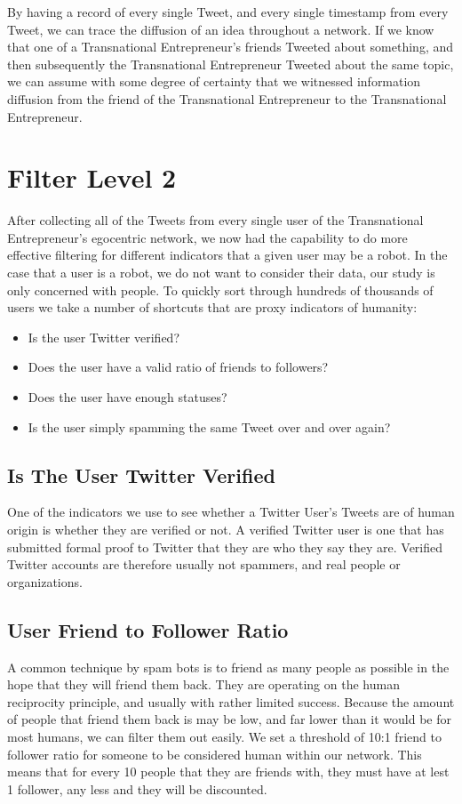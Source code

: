 By having a record of every single Tweet, and every single
timestamp from every Tweet, we can trace the diffusion of an idea
throughout a network. If we know that one of a Transnational
Entrepreneur's friends Tweeted about something, and then subsequently
the Transnational Entrepreneur Tweeted about the same topic, we can
assume with some degree of certainty that we witnessed information
diffusion from the friend of the Transnational Entrepreneur to the
Transnational Entrepreneur.

\section{Filter Level 2}
After collecting all of the Tweets from every single user of the
Transnational Entrepreneur's egocentric network, we now had the
capability to do more effective filtering for different indicators
that a given user may be a robot. In the case that a user is a robot,
we do not want to consider their data, our study is only concerned
with people. To quickly sort through hundreds of thousands of users we
take a number of shortcuts that are proxy indicators of humanity:

\begin{itemize}
\item Is the user Twitter verified?
\item Does the user have a valid ratio of friends to followers?
\item Does the user have enough statuses?
\item Is the user simply spamming the same Tweet over and over again?
\end{itemize}

\subsection{Is The User Twitter Verified}
One of the indicators we use to see whether a Twitter User's Tweets
are of human origin is whether they are verified or not. A verified
Twitter user is one that has submitted formal proof to Twitter that
they are who they say they are. Verified Twitter accounts are
therefore usually not spammers, and real people or organizations.

\subsection{User Friend to Follower Ratio}
A common technique by spam bots is to friend as many people as
possible in the hope that they will friend them back. They are
operating on the human reciprocity principle, and usually with rather
limited success. Because the amount of people that friend them back is
may be low, and far lower than it would be for most humans, we can
filter them out easily. We set a threshold of 10:1 friend to follower
ratio for someone to be considered human within our network. This
means that for every 10 people that they are friends with, they must
have at lest 1 follower, any less and they will be discounted.

